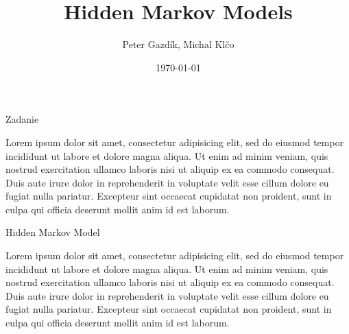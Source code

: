 \documentclass[10pt]{beamer}
\title{Hidden Markov Models}
\author{Peter Gazdík, Michal Klčo}
\date{\today}
\begin{document}
{%
}


\maketitle



\begin{frame}{Zadanie}

  Lorem ipsum dolor sit amet, consectetur adipisicing elit, sed do eiusmod tempor incididunt ut labore et dolore magna aliqua. Ut enim ad minim veniam, quis nostrud exercitation ullamco laboris nisi ut aliquip ex ea commodo consequat. Duis aute irure dolor in reprehenderit in voluptate velit esse cillum dolore eu fugiat nulla pariatur. Excepteur sint occaecat cupidatat non proident, sunt in culpa qui officia deserunt mollit anim id est laborum.

\end{frame}

\begin{frame}{Hidden Markov Model}

  Lorem ipsum dolor sit amet, consectetur adipisicing elit, sed do eiusmod tempor incididunt ut labore et dolore magna aliqua. Ut enim ad minim veniam, quis nostrud exercitation ullamco laboris nisi ut aliquip ex ea commodo consequat. Duis aute irure dolor in reprehenderit in voluptate velit esse cillum dolore eu fugiat nulla pariatur. Excepteur sint occaecat cupidatat non proident, sunt in culpa qui officia deserunt mollit anim id est laborum.

\end{frame}
\end{document}
